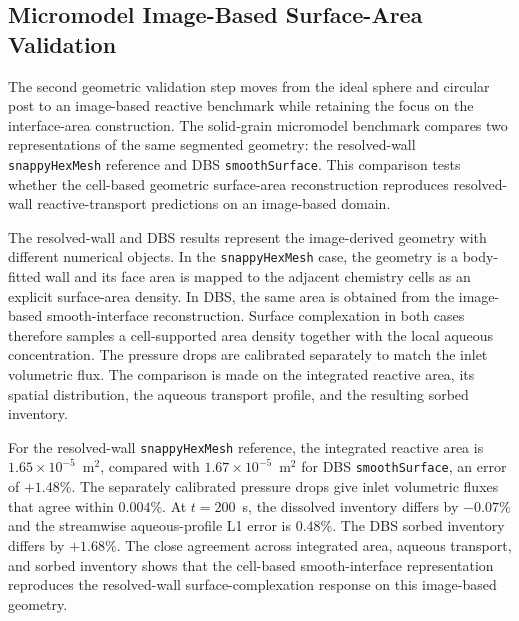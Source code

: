 \FloatBarrier

\subsection{Micromodel Image-Based Surface-Area Validation}

The second geometric validation step moves from the ideal sphere and circular
post to an image-based reactive benchmark while retaining the focus on the
interface-area construction. The solid-grain micromodel benchmark compares
two representations of the same segmented geometry: the resolved-wall
\texttt{snappyHexMesh} reference and DBS \texttt{smoothSurface}. This
comparison tests whether the cell-based geometric surface-area reconstruction
reproduces resolved-wall reactive-transport predictions on an image-based
domain.

The resolved-wall and DBS results represent the image-derived geometry with
different numerical objects. In the \texttt{snappyHexMesh} case, the geometry
is a body-fitted wall and its face area is mapped to the adjacent chemistry
cells as an explicit surface-area density. In DBS, the same area is obtained
from the image-based smooth-interface reconstruction. Surface complexation in
both cases therefore samples a cell-supported area density together with the
local aqueous concentration. The pressure drops are calibrated separately to
match the inlet volumetric flux. The comparison is made on the integrated
reactive area, its spatial distribution, the aqueous transport profile, and the
resulting sorbed inventory.

For the resolved-wall \texttt{snappyHexMesh} reference, the integrated
reactive area is $1.65 \times 10^{-5}$~m$^2$, compared with
$1.67 \times 10^{-5}$~m$^2$ for DBS \texttt{smoothSurface}, an error of
$+1.48\%$. The separately calibrated pressure drops give inlet volumetric
fluxes that agree within $0.004\%$. At $t=200$~s, the dissolved inventory
differs by $-0.07\%$ and the streamwise aqueous-profile L1 error is $0.48\%$.
The DBS sorbed inventory differs by $+1.68\%$. The close agreement across
integrated area, aqueous transport, and sorbed inventory shows that the
cell-based smooth-interface representation reproduces the resolved-wall
surface-complexation response on this image-based geometry.

